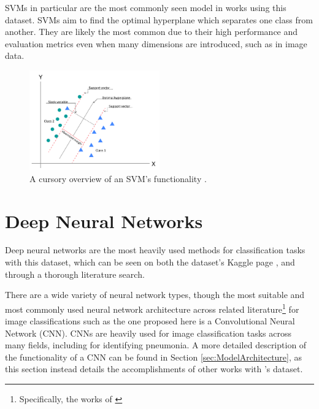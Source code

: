 \documentclass[12pt]{report}
\newcommand{\para}{\vspace{7pt}\noindent}
\begin{document}
\para SVMs in particular are the most commonly seen model in works using this dataset. SVMs aim to find the optimal hyperplane 
which separates one class from another. They are likely the most common due to their high performance and evaluation
metrics even when many dimensions are introduced, such as in image data. 

\begin{figure}[H]
    \centering
    \includegraphics[width=0.5\textwidth]{Proposal/SVM.png}
    \caption{A cursory overview of an SVM's functionality \autocite{ibmWhatSupportVector2023}.\label{fig:SVM}}
\end{figure}


\section{Deep Neural Networks}
Deep neural networks are the most heavily used methods for classification tasks with this dataset, which can be seen on both the 
dataset's Kaggle page \autocite{mooneyChestXRayImages2018}, and through a thorough literature search.

\para There are a wide variety of neural network 
types, though the most suitable and most commonly used neural network architecture across related literature\footnote{Specifically, the works of \textcite{elasnaouiDesignEnsembleDeep2021a,rajpurkarCheXNetRadiologistLevelPneumonia2017,sourabComparisonHybridDeep2022,stephenEfficientDeepLearning2019,umaribrahimConvolutionalNeuralNetwork2022b}} 
for image classifications such as the one proposed here is a Convolutional Neural Network (CNN).
CNNs are heavily used for image classification tasks across many fields, including for identifying pneumonia. A more detailed 
description of the functionality of a CNN can be found in Section \ref{sec:ModelArchitecture}, as this section instead details 
the accomplishments of other works with \textcite{kermanyIdentifyingMedicalDiagnoses2018}'s dataset.
\end{document}
